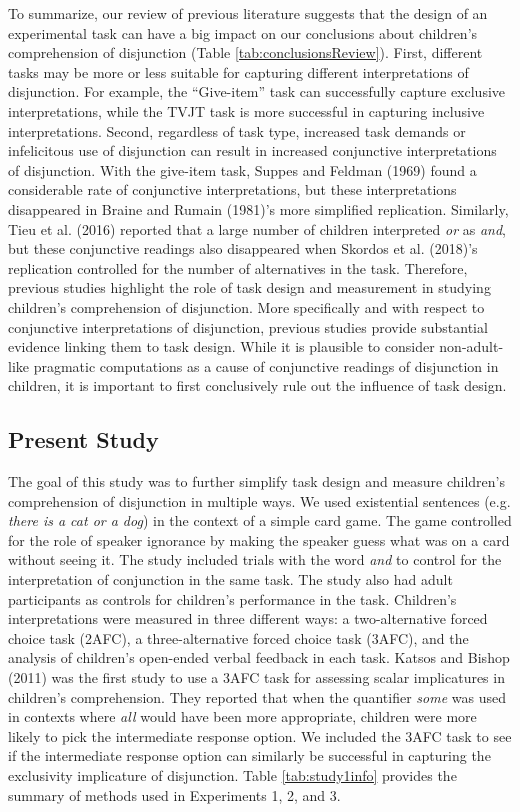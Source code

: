\documentclass[,man,floatsintext]{apa6}
\begin{document}
To summarize, our review of previous literature suggests that the design of an experimental task can have a big impact on our conclusions about children's comprehension of disjunction (Table \ref{tab:conclusionsReview}). First, different tasks may be more or less suitable for capturing different interpretations of disjunction. For example, the \enquote{Give-item} task can successfully capture exclusive interpretations, while the TVJT task is more successful in capturing inclusive interpretations. Second, regardless of task type, increased task demands or infelicitous use of disjunction can result in increased conjunctive interpretations of disjunction. With the give-item task, Suppes and Feldman (1969) found a considerable rate of conjunctive interpretations, but these interpretations disappeared in Braine and Rumain (1981)'s more simplified replication. Similarly, Tieu et al. (2016) reported that a large number of children interpreted \emph{or} as \emph{and}, but these conjunctive readings also disappeared when Skordos et al. (2018)'s replication controlled for the number of alternatives in the task. Therefore, previous studies highlight the role of task design and measurement in studying children's comprehension of disjunction. More specifically and with respect to conjunctive interpretations of disjunction, previous studies provide substantial evidence linking them to task design. While it is plausible to consider non-adult-like pragmatic computations as a cause of conjunctive readings of disjunction in children, it is important to first conclusively rule out the influence of task design.

\hypertarget{present-study}{%
\subsection{Present Study}\label{present-study}}

The goal of this study was to further simplify task design and measure children's comprehension of disjunction in multiple ways. We used existential sentences (e.g. \emph{there is a cat or a dog}) in the context of a simple card game. The game controlled for the role of speaker ignorance by making the speaker guess what was on a card without seeing it. The study included trials with the word \emph{and} to control for the interpretation of conjunction in the same task. The study also had adult participants as controls for children's performance in the task. Children's interpretations were measured in three different ways: a two-alternative forced choice task (2AFC), a three-alternative forced choice task (3AFC), and the analysis of children's open-ended verbal feedback in each task. Katsos and Bishop (2011) was the first study to use a 3AFC task for assessing scalar implicatures in children's comprehension. They reported that when the quantifier \emph{some} was used in contexts where \emph{all} would have been more appropriate, children were more likely to pick the intermediate response option. We included the 3AFC task to see if the intermediate response option can similarly be successful in capturing the exclusivity implicature of disjunction. Table \ref{tab:study1info} provides the summary of methods used in Experiments 1, 2, and 3.
\end{document}
